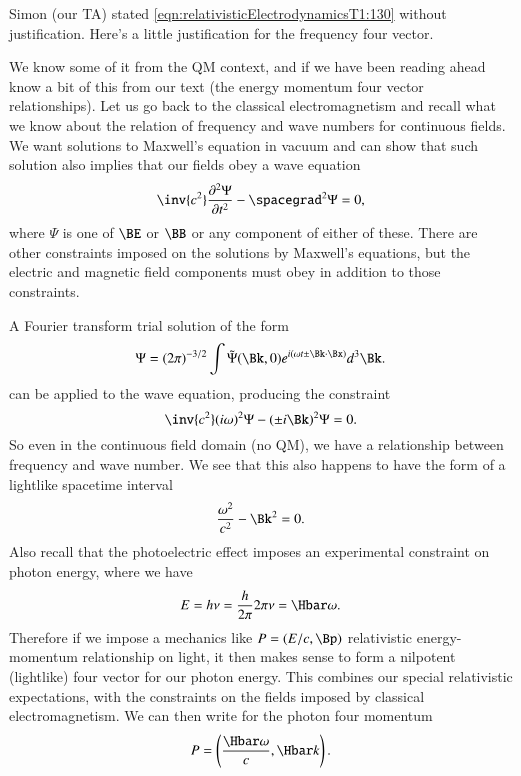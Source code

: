 %
%

Simon (our TA) stated \cref{eqn:relativisticElectrodynamicsT1:130} without justification.  Here's a little justification for the frequency four vector.

We know some of it from the QM context, and if we have been reading ahead know a bit of this from our text \citep{landau1980classical} (the energy momentum four vector relationships).  Let us go back to the classical electromagnetism and recall what we know about the relation of frequency and wave numbers for continuous fields.  We want solutions to Maxwell's equation in vacuum and can show that such solution also implies that our fields obey a wave equation
%
\begin{equation}\label{eqn:relativisticElectrodynamicsT1:131}
\inv{c^2} \frac{\partial^2 \Psi}{\partial t^2} - \spacegrad^2 \Psi = 0,
\end{equation}
%
where \(\Psi\) is one of \(\BE\) or \(\BB\) or any component of either of these.  There are other constraints imposed on the solutions by Maxwell's equations, but the electric and magnetic field components must obey  in addition to those constraints.

A Fourier transform trial solution of the form
%
\begin{equation}\label{eqn:relativisticElectrodynamicsT1:132}
\Psi = (2 \pi)^{-3/2} \int \tilde{\Psi}(\Bk, 0) e^{i (\omega t \pm \Bk \cdot \Bx) } d^3 \Bk.
\end{equation}
%
can be applied to the wave equation, producing the constraint
%
\begin{equation}\label{eqn:relativisticElectrodynamicsT1:133}
\inv{c^2} (i \omega)^2 \Psi - (\pm i \Bk)^2 \Psi = 0.
\end{equation}
%
So even in the continuous field domain (no QM), we have a relationship between frequency and wave number.  We see that this also happens to have the form of a lightlike spacetime interval
%
\begin{equation}\label{eqn:relativisticElectrodynamicsT1:134}
\frac{\omega^2}{c^2} - \Bk^2 = 0.
\end{equation}
%
Also recall that the photoelectric effect imposes an experimental constraint on photon energy, where we have
%
\begin{equation}\label{eqn:relativisticElectrodynamicsT1:135}
E = h \nu = \frac{h}{2\pi} 2 \pi \nu = \Hbar \omega.
\end{equation}
%
Therefore if we impose a mechanics like \(P = (E/c, \Bp) \) relativistic energy-momentum relationship on light, it then makes sense to form a nilpotent (lightlike) four vector for our photon energy.  This combines our special relativistic expectations, with the constraints on the fields imposed by classical electromagnetism.  We can then write for the photon four momentum
%
\begin{equation}\label{eqn:relativisticElectrodynamicsT1:136}
P = \left( \frac{\Hbar \omega}{c}, \Hbar k \right).
\end{equation}
%
